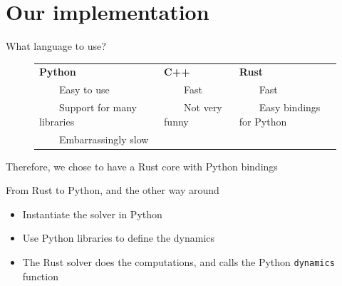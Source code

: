 \documentclass[aspectratio=169]{beamer}
\newcommand{\tabitem}{~~\llap{\textbullet}~~}
\theoremstyle{definition}
\begin{document}
\section{Our implementation}
\begin{frame}{What language to use?}
    \begin{figure}
        \centering
        \renewcommand{\arraystretch}{1.4}
        \begin{tabular}{p{5cm}p{3.5cm}p{4.5cm}}
            \centering\textbf{Python}&\centering\textbf{C++}&\hspace{1.6cm}\textbf{Rust}\\
            \tabitem Easy to use&\tabitem Fast&\tabitem Fast\\
            \tabitem Support for many libraries&\tabitem Not very funny&\tabitem Easy bindings for Python\\
            \tabitem Embarrassingly slow&&
        \end{tabular}
    \end{figure}
    \vspace*{1cm}
    \centering
    Therefore, we chose to have a Rust core with Python bindings
\end{frame}

\begin{frame}{From Rust to Python, and the other way around}
    \begin{itemize}
        \item Instantiate the solver in Python
        \item Use Python libraries to define the dynamics
        \item The Rust solver does the computations, and calls the Python \texttt{dynamics} function
    \end{itemize}
\end{frame}
\end{document}
